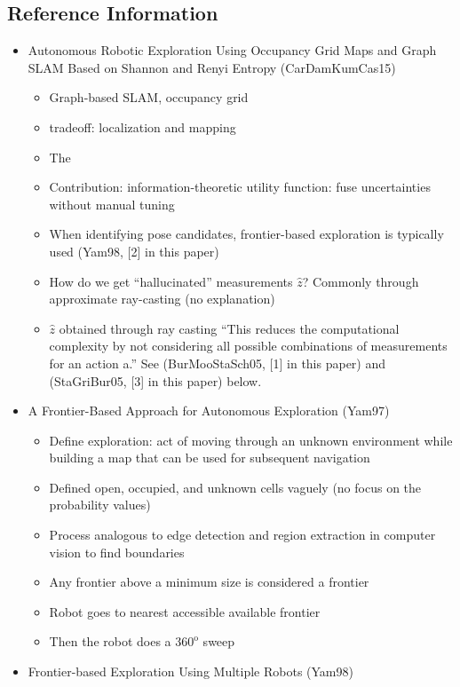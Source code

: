 \documentclass[10pt]{article}
\theoremstyle{plain}\theorembodyfont{\normalfont}
\begin{document}
\subsection*{Reference Information}
\begin{itemize}
	\item Autonomous Robotic Exploration Using Occupancy Grid Maps and Graph SLAM Based on Shannon and Renyi Entropy (CarDamKumCas15)
	\begin{itemize}
		\item Graph-based SLAM, occupancy grid
		\item tradeoff: localization and mapping
		\item The 
		\item Contribution: information-theoretic utility function: fuse uncertainties without manual tuning
		\item When identifying pose candidates, frontier-based exploration is typically used (Yam98, [2] in this paper)
		\item How do we get ``hallucinated'' measurements $\hat z$? Commonly through approximate ray-casting (no explanation)
		\item $\hat z$ obtained through ray casting ``This reduces the computational complexity by not considering all possible combinations of measurements for an action a.'' See (BurMooStaSch05, [1] in this paper) and (StaGriBur05, [3] in this paper) below.
	\end{itemize}
	\item A Frontier-Based Approach for Autonomous Exploration (Yam97)
	\begin{itemize}
		\item Define exploration: act of moving through an unknown environment while building a map that can be used for subsequent navigation
		\item Defined open, occupied, and unknown cells vaguely (no focus on the probability values)
		\item Process analogous to edge detection and region extraction in computer vision to find boundaries
		\item Any frontier above a minimum size is considered a frontier
		\item Robot goes to nearest accessible available frontier
		\item Then the robot does a $360^\text{o}$ sweep
	\end{itemize}
	\item Frontier-based Exploration Using Multiple Robots (Yam98)
	\begin{itemize}

\end{itemize}
\end{itemize}
\end{document}
